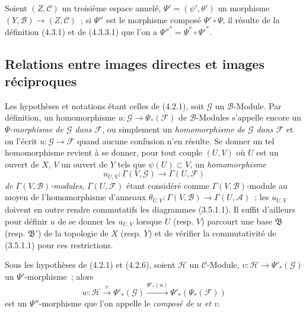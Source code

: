 \begin{env}[4.3.6]
\label{0.4.3.6-fr}
Soient $(Z,\mathcal{C})$ un troisième espace annelé,
$\Psi'=(\psi',\theta')$ un morphisme $(Y,\mathcal{B})\to(Z,\mathcal{C})$~;
si $\Psi''$ est le morphisme composé $\Psi'\circ\Psi$, il résulte de la
définition (4.3.1) et de (4.3.3.1) que l'on a
${\Psi''}^*=\Psi^*\circ{\Psi'}^*$.
\end{env}

\subsection{Relations entre images directes et images réciproques}
\label{subsection:0.4.4-fr}

\begin{env}[4.4.1]
\label{0.4.4.1-fr}
Les hypothèses et notations étant celles de (4.2.1), soit $\mathcal{G}$ un
$\mathcal{B}$-Module. Par définition, un homomorphisme
$u:\mathcal{G}\to\Psi_*(\mathcal{F})$ de $\mathcal{B}$-Modules s'appelle
encore un \emph{$\Psi$-morphisme de $\mathcal{G}$ dans $\mathcal{F}$}, ou
simplement un \emph{homomorphisme de $\mathcal{G}$ dans $\mathcal{F}$} et on
l'écrit $u:\mathcal{G}\to\mathcal{F}$ quand aucune confusion n'en résulte.
Se donner un tel homomorphisme revient à se donner, pour tout couple $(U,V)$
où $U$ est un ouvert de $X$, $V$ un ouvert de $Y$ tels que
$\psi(U)\subset V$, un \emph{homomorphisme}
\[
  u_{U,V}:\Gamma(V,\mathcal{G})\longrightarrow\Gamma(U,\mathcal{F})
\]
\emph{de $\Gamma(V,\mathcal{B})$-modules}, $\Gamma(U,\mathcal{F})$ étant
considéré comme $\Gamma(V,\mathcal{B})$-module au moyen de l'homomorphisme
d'anneaux
$\theta_{U,V}:\Gamma(V,\mathcal{B})\to\Gamma(U,\mathcal{A})$~; les $u_{U,V}$
doivent en outre rendre commutatifs les diagrammes (3.5.1.1). Il suffit
d'ailleurs pour définir $u$ de se donner les $u_{U,V}$ lorsque $U$ (resp.
$V$) parcourt une base $\mathfrak{B}$ (resp. $\mathfrak{B}'$) de la topologie
de $X$ (resp. $Y$) et de vérifier la commutativité de (3.5.1.1) pour ces
restrictions.
\end{env}

\begin{env}[4.4.2]
\label{0.4.4.2-fr}
Sous les hypothèses de (4.2.1) et (4.2.6), soient $\mathcal{H}$ un
$\mathcal{C}$-Module, $v:\mathcal{H}\to\Psi'_*(\mathcal{G})$ un
$\Psi'$-morphisme~; alors
\[
  w:\mathcal{H}\xrightarrow{v}\Psi'_*(\mathcal{G})
  \xrightarrow{\Psi'_*(u)}\Psi'_*(\Psi_*(\mathcal{F}))
\]
est un $\Psi''$-morphisme que l'on appelle le \emph{composé de $u$ et $v$}.
\end{env}

